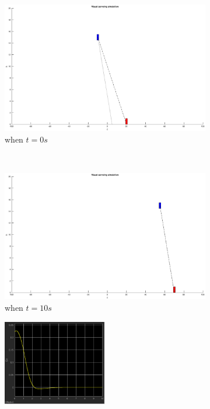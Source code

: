 \begin{figure}[htbp]
	\centering
	\begin{subfigure}[t]{0.45\linewidth}
		\includegraphics[width=\textwidth]{images/chapter4/simple_zero}
		\caption{when $t=0s$}
	\end{subfigure}
	~ %
	\begin{subfigure}[t]{0.45\linewidth}
		\includegraphics[width=\textwidth]{images/chapter4/simple_ten}
		\caption{when $t=10s$}
	\end{subfigure}
	\begin{subfigure}[t]{0.8\linewidth}
		\centering
		\includegraphics[width=0.5\textwidth]{images/chapter4/simple_ex}

\end{subfigure}
\end{figure}

